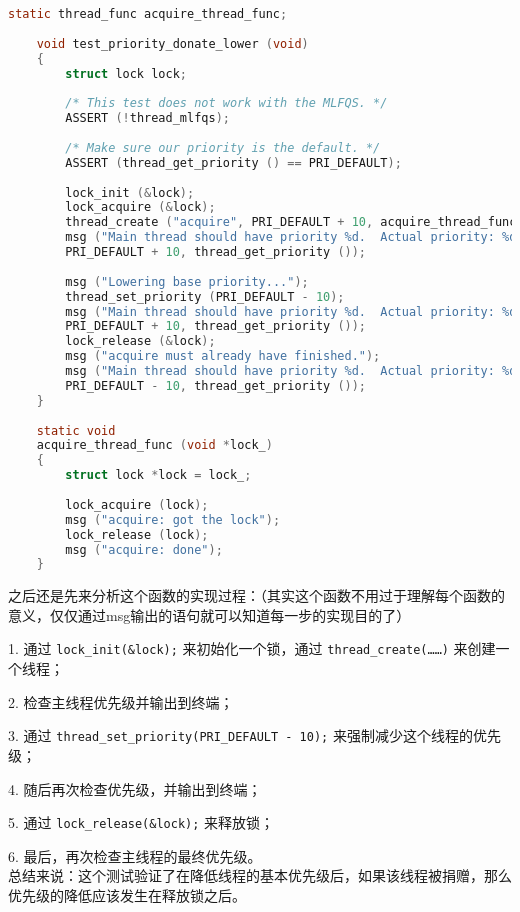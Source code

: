 \documentclass{article}
\begin{document}
	\begin{lstlisting}[language=C, title=\texttt{priority-donate-lower}测试]
    static thread_func acquire_thread_func;
    
    void test_priority_donate_lower (void) 
    {
    	struct lock lock;
    	
    	/* This test does not work with the MLFQS. */
    	ASSERT (!thread_mlfqs);
    	
    	/* Make sure our priority is the default. */
    	ASSERT (thread_get_priority () == PRI_DEFAULT);
    	
    	lock_init (&lock);
    	lock_acquire (&lock);
    	thread_create ("acquire", PRI_DEFAULT + 10, acquire_thread_func, &lock);
    	msg ("Main thread should have priority %d.  Actual priority: %d.",
    	PRI_DEFAULT + 10, thread_get_priority ());
    	
    	msg ("Lowering base priority...");
    	thread_set_priority (PRI_DEFAULT - 10);
    	msg ("Main thread should have priority %d.  Actual priority: %d.",
    	PRI_DEFAULT + 10, thread_get_priority ());
    	lock_release (&lock);
    	msg ("acquire must already have finished.");
    	msg ("Main thread should have priority %d.  Actual priority: %d.",
    	PRI_DEFAULT - 10, thread_get_priority ());
    }
    
    static void
    acquire_thread_func (void *lock_) 
    {
    	struct lock *lock = lock_;
    	
    	lock_acquire (lock);
    	msg ("acquire: got the lock");
    	lock_release (lock);
    	msg ("acquire: done");
    }
	\end{lstlisting}
	
	之后还是先来分析这个函数的实现过程：（其实这个函数不用过于理解每个函数的意义，仅仅通过msg输出的语句就可以知道每一步的实现目的了）
	
	1. 通过 \texttt{lock\_init(\&lock);} 来初始化一个锁，通过 \texttt{thread\_create(……)} 来创建一个线程；
	
	2. 检查主线程优先级并输出到终端；
	
	3. 通过 \texttt{thread\_set\_priority(PRI\_DEFAULT - 10);} 来强制减少这个线程的优先级；
	
	4. 随后再次检查优先级，并输出到终端；
	
	5. 通过 \texttt{lock\_release(\&lock);} 来释放锁；
	
	6. 最后，再次检查主线程的最终优先级。\\[1em]
	
	总结来说：这个测试验证了在降低线程的基本优先级后，如果该线程被捐赠，那么优先级的降低应该发生在释放锁之后。
	
\end{document}
